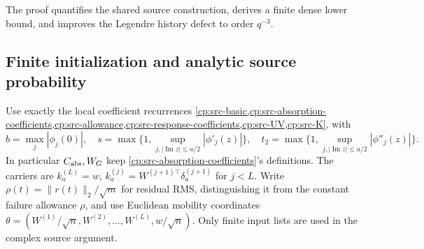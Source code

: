 The proof quantifies the shared source construction, derives a finite dense
lower bound, and improves the Legendre history defect to order $q^{-3}$.

\subsection{Finite initialization and analytic source probability}
\label{cp:poly:source-section}

Use exactly the local coefficient recurrences
\cref{cp:src-basic,cp:src-absorption-coefficients,cp:src-allowance,cp:src-response-coefficients,cp:src-UV,cp:src-K}, with
\[
b=\max_j|\phi_j(0)|,\quad
s=\max\{1,\sup_{j,|\operatorname{Im}z|\le a/2}|\phi'_j(z)|\},\quad
t_2=\max\{1,\sup_{j,|\operatorname{Im}z|\le a/2}|\phi''_j(z)|\}.
\]
In particular $C_{\rm abs},W_G$ keep
\eqref{cp:src-absorption-coefficients}'s definitions.
The carriers are $k_a^{(L)}=w$,
$k_a^{(j)}=W^{(j+1)\top}\delta_a^{(j+1)}$ for $j<L$.
Write $\rho(t)=\|r(t)\|_2/\sqrt m$ for residual RMS, distinguishing it
from the constant failure allowance $\rho$, and use Euclidean mobility
coordinates
$\theta=(W^{(1)}/\sqrt n,W^{(2)},\ldots,W^{(L)},w/\sqrt n)$.
Only finite input lists are used in the complex source argument.

